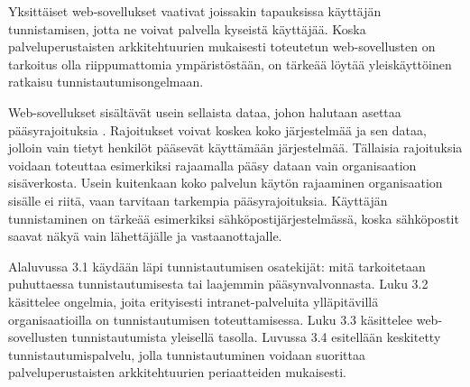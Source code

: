 Yksittäiset web-sovellukset vaativat joissakin tapauksissa käyttäjän tunnistamisen, jotta ne voivat palvella kyseistä käyttäjää. Koska palveluperustaisten arkkitehtuurien mukaisesti toteutetun web-sovellusten on tarkoitus olla riippumattomia ympäristöstään, on tärkeää löytää yleiskäyttöinen ratkaisu tunnistautumisongelmaan.

Web-sovellukset sisältävät usein sellaista dataa, johon halutaan asettaa pääsyrajoituksia \cite{inside_the_identity_management_game}. Rajoitukset voivat koskea koko järjestelmää ja sen dataa, jolloin vain tietyt henkilöt pääsevät käyttämään järjestelmää. Tällaisia rajoituksia voidaan toteuttaa esimerkiksi rajaamalla pääsy dataan vain organisaation sisäverkosta. Usein kuitenkaan koko palvelun käytön rajaaminen organisaation sisälle ei riitä, vaan tarvitaan tarkempia pääsyrajoituksia. Käyttäjän tunnistaminen on tärkeää esimerkiksi sähköpostijärjestelmässä, koska sähköpostit saavat näkyä vain lähettäjälle ja vas\-taan\-ot\-ta\-jal\-le.

Alaluvussa 3.1 käydään läpi tunnistautumisen osatekijät: mitä tarkoitetaan puhuttaessa tunnistautumisesta tai laajemmin pääsynvalvonnasta. Luku 3.2 käsittelee ongelmia, joita erityisesti intranet-palveluita ylläpitävillä organisaatioilla on tunnistautumisen toteuttamisessa. Luku 3.3 käsittelee web-sovellusten tunnistautumista yleisellä tasolla. Luvussa 3.4 esitellään keskitetty tunnistautumispalvelu, jolla tunnistautuminen voidaan suorittaa palveluperustaisten arkkitehtuurien periaatteiden mukaisesti.